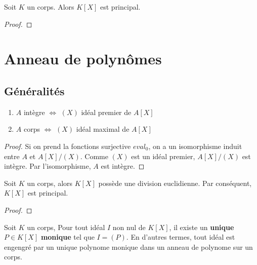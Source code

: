\begin{proposition}
	Soit $K$ un corps. Alors $K[X]$ est principal.
\end{proposition}

\ifdefined\outputproof
\begin{proof}

\end{proof}
\fi


\section{Anneau de polynômes}

\subsection{Généralités}

\begin{proposition}
	\begin{enumerate}
		\item $A$ intègre $\Leftrightarrow$ $(X)$ idéal premier de $A[X]$
		\item $A$ corps $\Leftrightarrow$ $(X)$ idéal maximal de $A[X]$
	\end{enumerate}
\end{proposition}

\ifdefined\outputproof
\begin{proof}
	Si on prend la fonctions surjective $eval_{0}$, on a un isomorphisme induit
	entre $A$ et $A[X]/(X)$. Comme $(X)$ est un idéal premier, $A[X]/(X)$ est
	intègre. Par l'isomorphisme, $A$ est intègre.
\end{proof}
\fi

\begin{proposition}
	Soit $K$ un corps, alors $K[X]$ possède une division euclidienne. Par
	conséquent, $K[X]$ est principal.
\end{proposition}

\ifdefined\outputproof
\begin{proof}
\end{proof}
\fi

\begin{proposition}
	Soit $K$ un corps,
	Pour tout idéal $I$ non nul de $K[X]$, il existe un \textbf{unique} $P \in K[X]$
	\textbf{monique} tel que $I = (P)$. En d'autres termes, tout idéal est
  engengré par un unique polynome monique dans un anneau de polynome sur un corps.
\end{proposition}

